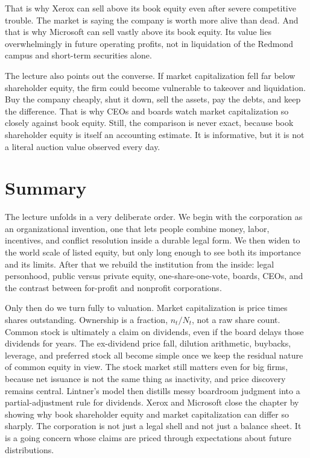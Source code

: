 That is why Xerox can sell above its book equity even after severe competitive trouble. The market is saying the company is worth more alive than dead. And that is why Microsoft can sell vastly above its book equity. Its value lies overwhelmingly in future operating profits, not in liquidation of the Redmond campus and short-term securities alone.

The lecture also points out the converse. If market capitalization fell far below shareholder equity, the firm could become vulnerable to takeover and liquidation. Buy the company cheaply, shut it down, sell the assets, pay the debts, and keep the difference. That is why CEOs and boards watch market capitalization so closely against book equity. Still, the comparison is never exact, because book shareholder equity is itself an accounting estimate. It is informative, but it is not a literal auction value observed every day.

\section{Summary}

The lecture unfolds in a very deliberate order. We begin with the corporation as an organizational invention, one that lets people combine money, labor, incentives, and conflict resolution inside a durable legal form. We then widen to the world scale of listed equity, but only long enough to see both its importance and its limits. After that we rebuild the institution from the inside: legal personhood, public versus private equity, one-share-one-vote, boards, CEOs, and the contrast between for-profit and nonprofit corporations.

Only then do we turn fully to valuation. Market capitalization is price times shares outstanding. Ownership is a fraction, $n_t/N_t$, not a raw share count. Common stock is ultimately a claim on dividends, even if the board delays those dividends for years. The ex-dividend price fall, dilution arithmetic, buybacks, leverage, and preferred stock all become simple once we keep the residual nature of common equity in view. The stock market still matters even for big firms, because net issuance is not the same thing as inactivity, and price discovery remains central. Lintner's model then distills messy boardroom judgment into a partial-adjustment rule for dividends. Xerox and Microsoft close the chapter by showing why book shareholder equity and market capitalization can differ so sharply. The corporation is not just a legal shell and not just a balance sheet. It is a going concern whose claims are priced through expectations about future distributions.